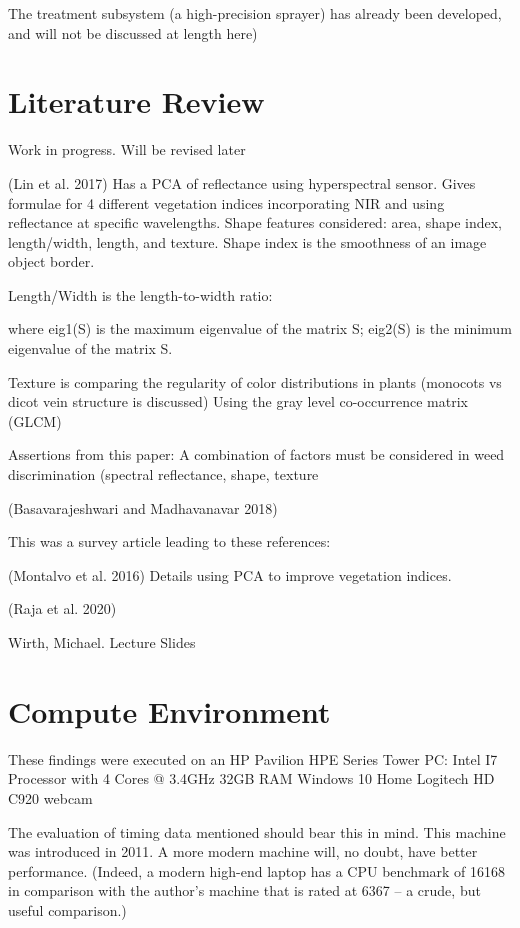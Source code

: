 \documentclass[letterpaper]{article}
\begin{document}
The treatment subsystem (a high-precision sprayer) has already been developed, and will not be discussed at length here)

\section{Literature Review}
Work in progress. Will be revised later

(Lin et al. 2017)
Has a PCA of reflectance using hyperspectral sensor.
Gives formulae for 4 different vegetation indices incorporating NIR and using reflectance at specific wavelengths.
Shape features considered: area, shape index, length/width, length, and texture. Shape index is the smoothness of an image object border.

Length/Width is the length-to-width ratio:




where eig1(S) is the maximum eigenvalue of the matrix S; eig2(S) is the minimum eigenvalue of the matrix S.

Texture is comparing the regularity of color distributions in plants  (monocots vs dicot vein structure is discussed) Using the gray level co-occurrence matrix (GLCM)


Assertions from this paper:
A combination of factors must be considered in weed discrimination (spectral reflectance, shape, texture

(Basavarajeshwari and Madhavanavar 2018)

This was a survey article leading to these references:

(Montalvo et al. 2016)
Details using PCA to improve vegetation indices.

(Raja et al. 2020)

Wirth, Michael. Lecture Slides

\section{Compute Environment}
These findings were executed on an HP Pavilion HPE Series Tower PC:
Intel I7 Processor with 4 Cores @ 3.4GHz
32GB RAM
Windows 10 Home
Logitech HD C920 webcam

The evaluation of timing data mentioned should bear this in mind. This machine was introduced in 2011. A more modern machine will, no doubt, have better performance. (Indeed, a modern high-end laptop has a CPU benchmark of 16168 in comparison with the author’s machine that is rated at 6367 -- a crude, but useful comparison.)
\end{document}
